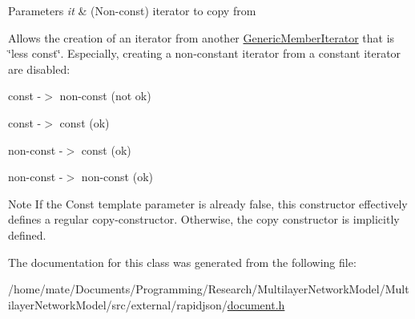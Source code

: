 \begin{DoxyParams}{Parameters}
{\em it} & (Non-\/const) iterator to copy from\\
\hline
\end{DoxyParams}
Allows the creation of an iterator from another \hyperlink{classGenericMemberIterator}{Generic\+Member\+Iterator} that is \char`\"{}less const\char`\"{}. Especially, creating a non-\/constant iterator from a constant iterator are disabled\+: \begin{DoxyItemize}
\item const -\/$>$ non-\/const (not ok) \item const -\/$>$ const (ok) \item non-\/const -\/$>$ const (ok) \item non-\/const -\/$>$ non-\/const (ok)\end{DoxyItemize}
\begin{DoxyNote}{Note}
If the {\ttfamily Const} template parameter is already {\ttfamily false}, this constructor effectively defines a regular copy-\/constructor. Otherwise, the copy constructor is implicitly defined. 
\end{DoxyNote}


The documentation for this class was generated from the following file\+:\begin{DoxyCompactItemize}
\item 
/home/mate/\+Documents/\+Programming/\+Research/\+Multilayer\+Network\+Model/\+Multilayer\+Network\+Model/src/external/rapidjson/\hyperlink{document_8h}{document.\+h}\end{DoxyCompactItemize}
